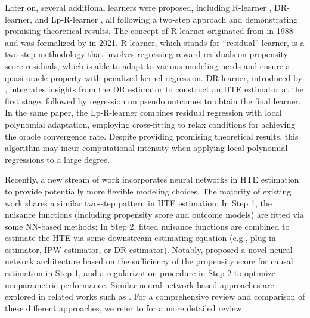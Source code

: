 Later on, several additional learners were proposed, including R-learner \citep{nie2021quasi}, DR-learner, and Lp-R-learner \citep{kennedy2020towards}, all following a two-step approach and demonstrating promising theoretical results.  The concept of R-learner originated from \citet{robinson1988root} in 1988 and was formalized by \citet{nie2021quasi} in 2021. R-learner, which stands for ``residual'' learner, is a two-step methodology that involves regressing reward residuals on propensity score residuals, which is able to adapt to various modeling needs and ensure a quasi-oracle property with penalized kernel regression. DR-learner, introduced by \citet{kennedy2020towards}, integrates insights from the \acrshort{DR} estimator to construct an \acrshort{HTE} estimator at the first stage, followed by regression on pseudo outcomes to obtain the final learner. In the same paper, the Lp-R-learner combines residual regression with local polynomial adaptation, employing cross-fitting to relax conditions for achieving the oracle convergence rate. Despite providing promising theoretical results, this algorithm may incur computational intensity when applying local polynomial regressions to a large degree.

Recently, a new stream of work incorporates neural networks in \acrshort{HTE} estimation to provide potentially more flexible modeling choices. The majority of existing work shares a similar two-step pattern in \acrshort{HTE} estimation: In Step 1, the nuisance functions (including propensity score and outcome models) are fitted via some NN-based methods; In Step 2, fitted nuisance functions are combined to estimate the  \acrshort{HTE} via some downstream estimating equation (e.g., plug-in estimator, IPW estimator, or \acrshort{DR} estimator). Notably,  \citet{shi2019adapting} proposed a novel neural network architecture based on the sufficiency of the propensity score for causal estimation in Step 1, and a regularization procedure in Step 2 to optimize nonparametric performance. Similar neural network-based approaches are explored in related works such as \citet{johansson2016learning, shalit2017estimating, hassanpour2019learning}. For a comprehensive review and comparison of these different approaches, we refer to \citet{curth2021nonparametric} for a more detailed review.


